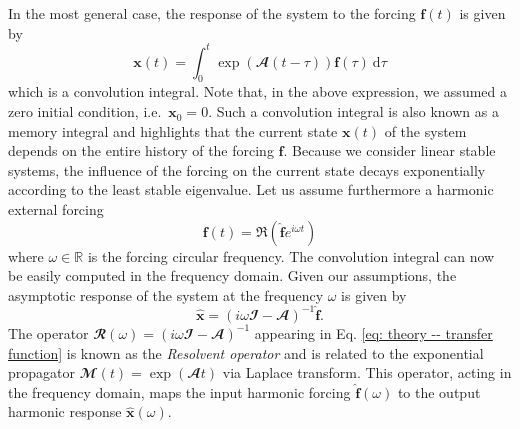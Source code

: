     In the most general case, the response of the system to the forcing $\mathbf{f}(t)$ is given by
    \begin{equation}
      \mathbf{x}(t) = \int_0^t \exp \left( \mathbfcal{A} (t-\tau) \right) \mathbf{f}(\tau) \ \mathrm{d}\tau
      \label{eq: theory -- convolution integral}
    \end{equation}
    which is a convolution integral. Note that, in the above expression, we assumed a zero initial condition, i.e.\ $\mathbf{x}_0 = 0$. Such a convolution integral is also known as a memory integral and highlights that the current state $\mathbf{x}(t)$ of the system depends on the entire history of the forcing $\mathbf{f}$. Because we consider linear stable systems, the influence of the forcing on the current state decays exponentially according to the least stable eigenvalue. Let us assume furthermore a harmonic external forcing
    \begin{equation}
      \mathbf{f}(t) = \Re \left( \hat{\mathbf{f}} e^{i \omega t} \right)
    \end{equation}
    where $\omega \in \mathbb{R}$ is the forcing circular frequency. The convolution integral can now be easily computed in the frequency domain. Given our assumptions, the asymptotic response of the system at the frequency $\omega$ is given by
    \begin{equation}
      \hat{\mathbf{x}} = \left( i \omega \mathbfcal{I} - \mathbfcal{A} \right)^{-1} \hat{\mathbf{f}}.
      \label{eq: theory -- transfer function}
    \end{equation}
    The operator $\mathbfcal{R}(\omega) = \left( i \omega \mathbfcal{I} - \mathbfcal{A} \right)^{-1}$ appearing in Eq. \eqref{eq: theory -- transfer function} is known as the \emph{Resolvent operator} and is related to the exponential propagator $\mathbfcal{M}(t) = \exp \left( \mathbfcal{A} t \right)$ via Laplace transform. This operator, acting in the frequency domain, maps the input harmonic forcing $\hat{\mathbf{f}}(\omega)$ to the output harmonic response $\hat{\mathbf{x}}(\omega)$.

